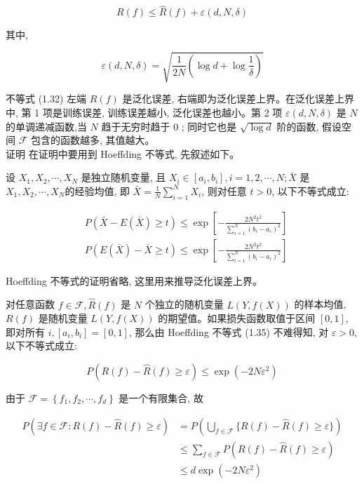 \documentclass[10pt]{article}
\begin{document}
\begin{equation*}
R(f) \leqslant \hat{R}(f)+\varepsilon(d, N, \delta) \tag{1.32}
\end{equation*}


其中,


\begin{equation*}
\varepsilon(d, N, \delta)=\sqrt{\frac{1}{2 N}\left(\log d+\log \frac{1}{\delta}\right)} \tag{1.33}
\end{equation*}


不等式 (1.32) 左端 $R(f)$ 是泛化误差, 右端即为泛化误差上界。在泛化误差上界中, 第 1 项是训练误差, 训练误差越小, 泛化误差也越小。第 2 项 $\varepsilon(d, N, \delta)$ 是 $N$ 的单调递减函数,当 $N$ 趋于无穷时趋于 0 ; 同时它也是 $\sqrt{\log d}$ 阶的函数, 假设空间 $\mathcal{F}$ 包含的函数越多, 其值越大。\\
证明 在证明中要用到 Hoeffding 不等式, 先叙述如下。

设 $X_{1}, X_{2}, \cdots, X_{N}$ 是独立随机变量, 且 $X_{i} \in\left[a_{i}, b_{i}\right], i=1,2, \cdots, N ; \bar{X}$ 是 $X_{1}, X_{2}, \cdots, X_{N}$的经验均值, 即 $\bar{X}=\frac{1}{N} \sum_{i=1}^{N} X_{i}$, 则对任意 $t>0$, 以下不等式成立:


\begin{align*}
& P(\bar{X}-E(\bar{X}) \geqslant t) \leqslant \exp \left[-\frac{2 N^{2} t^{2}}{\sum_{i=1}^{N}\left(b_{i}-a_{i}\right)^{2}}\right]  \tag{1.34}\\
& P(E(\bar{X})-\bar{X} \geqslant t) \leqslant \exp \left[-\frac{2 N^{2} t^{2}}{\sum_{i=1}^{N}\left(b_{i}-a_{i}\right)^{2}}\right] \tag{1.35}
\end{align*}


Hoeffding 不等式的证明省略, 这里用来推导泛化误差上界。

对任意函数 $f \in \mathcal{F}, \hat{R}(f)$ 是 $N$ 个独立的随机变量 $L(Y, f(X))$ 的样本均值, $R(f)$ 是随机变量 $L(Y, f(X))$ 的期望值。如果损失函数取值于区间 $[0,1]$, 即对所有 $i,\left[a_{i}, b_{i}\right]=[0,1]$, 那么由 Hoeffding 不等式 (1.35) 不难得知, 对 $\varepsilon>0$, 以下不等式成立:


\begin{equation*}
P(R(f)-\hat{R}(f) \geqslant \varepsilon) \leqslant \exp \left(-2 N \varepsilon^{2}\right) \tag{1.36}
\end{equation*}


由于 $\mathcal{F}=\left\{f_{1}, f_{2}, \cdots, f_{d}\right\}$ 是一个有限集合, 故

$$
\begin{aligned}
P(\exists f \in \mathcal{F}: R(f)-\hat{R}(f) \geqslant \varepsilon) & =P\left(\bigcup_{f \in \mathcal{F}}\{R(f)-\hat{R}(f) \geqslant \varepsilon\}\right) \\
& \leqslant \sum_{f \in \mathcal{F}} P(R(f)-\hat{R}(f) \geqslant \varepsilon) \\
& \leqslant d \exp \left(-2 N \varepsilon^{2}\right)
\end{aligned}
$$
\end{document}
